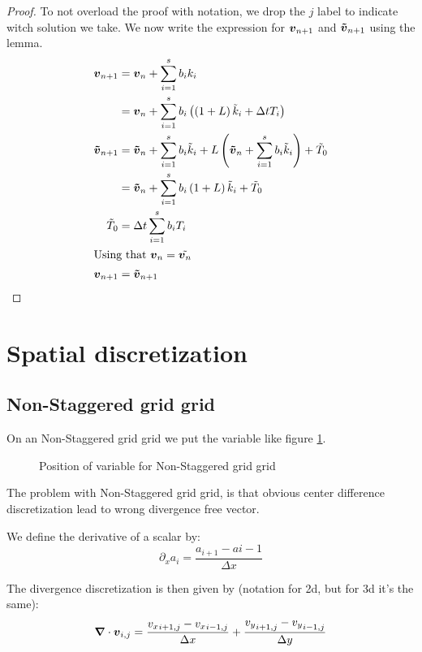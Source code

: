 \begin{proof}
To not overload the proof with notation, we drop the $j$ label to indicate witch solution we take.
We now write the expression for ${\boldsymbol {v}}_{n+1}$ and ${\boldsymbol {\tilde{v}}}_{n+1}$ using the lemma.
\begin{align*}
{\boldsymbol {v}}_{n+1}&={\boldsymbol {v}}_{n}+\sum_{i=1}^{s}b_{i}k_{i}\\
&={\boldsymbol {v}}_{n}+\sum_{i=1}^{s}b_{i}\left(\left(1+L\right)\tilde{k}_i+\Delta t T_{i}\right)\\
{\boldsymbol {\tilde{v}}}_{n+1}&={\boldsymbol {\tilde{v}}}_{n}+\sum_{i=1}^{s}b_{i}\tilde{k}_{i}+L\left({\boldsymbol {\tilde{v}}}_{n}+\sum_{i=1}^{s}b_{i}\tilde{k}_{i}\right)+\tilde{T}_0\\
&={\boldsymbol {\tilde{v}}}_{n}+\sum_{i=1}^{s}b_{i}\left(1+L\right)\tilde{k}_{i}+\tilde{T}_0\\
\tilde{T}_0&=\Delta t\sum_{i=1}^{s}b_{i}T_{i}\\
\intertext{Using that ${\boldsymbol {v}}_{n}=\tilde{{\boldsymbol {v}}_{n}}$}
{\boldsymbol {v}}_{n+1}&={\boldsymbol {\tilde{v}}}_{n+1}
\end{align*}

\end{proof}

\section{Spatial discretization}

\subsection{Non-Staggered grid grid}

On an Non-Staggered grid grid we put the variable like figure \ref{fixed:unstaggered}.

\begin{figure}
\caption{Position of variable for Non-Staggered grid grid}
\label{fixed:unstaggered}
\end{figure}

The problem with Non-Staggered grid grid, is that obvious center difference discretization lead to wrong divergence free vector.

We define the derivative of a scalar by:
\begin{equation}
  \partial_x a_i=\frac{a_{i+1}-a{i-1}}{\Delta x}
\end{equation}

The divergence discretization is then given by (notation for 2d, but for 3d it's the same):
\begin{equation}
  {\boldsymbol {\nabla}} \cdot {\boldsymbol {v}}_{i,j}=\frac{{v_{x}}_{i+1,j}-{v_{x}}_{i-1,j}}{\Delta x}+\frac{{v_{y}}_{i+1,j}-{v_{y}}_{i-1,j}}{\Delta y}
\end{equation}

